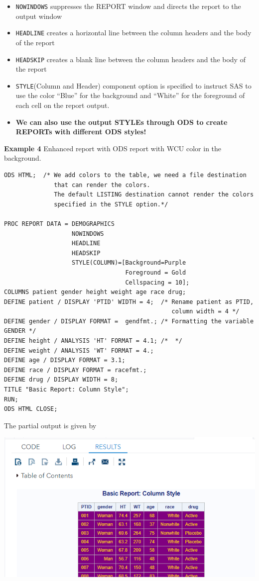 \documentclass[
]{book}
\begin{document}
\begin{itemize}
\item
  \texttt{NOWINDOWS} suppresses the REPORT window and directs the report to the output window
\item
  \texttt{HEADLINE} creates a horizontal line between the column headers and the body of the report
\item
  \texttt{HEADSKIP} creates a blank line between the column headers and the body of the report
\item
  \texttt{STYLE}(Column and Header) component option is specified to instruct SAS to use the color ``Blue'' for the background and ``White'' for the foreground of each cell on the report output.
\item
  \textbf{We can also use the output STYLEs through ODS to create REPORTs with different ODS styles!}
\end{itemize}

\textbf{Example 4} Enhanced report with ODS report with WCU color in the background.

\begin{verbatim}
ODS HTML;  /* We add colors to the table, we need a file destination 
              that can render the colors.
              The default LISTING destination cannot render the colors 
              specified in the STYLE option.*/

PROC REPORT DATA = DEMOGRAPHICS
                   NOWINDOWS
                   HEADLINE
                   HEADSKIP
                   STYLE(COLUMN)=[Background=Purple 
                                  Foreground = Gold 
                                  Cellspacing = 10];
COLUMNS patient gender height weight age race drug;
DEFINE patient / DISPLAY 'PTID' WIDTH = 4;  /* Rename patient as PTID, 
                                               column width = 4 */
DEFINE gender / DISPLAY FORMAT =  gendfmt.; /* Formatting the variable GENDER */
DEFINE height / ANALYSIS 'HT' FORMAT = 4.1; /*  */
DEFINE weight / ANALYSIS 'WT' FORMAT = 4.;
DEFINE age / DISPLAY FORMAT = 3.1;
DEFINE race / DISPLAY FORMAT = racefmt.;
DEFINE drug / DISPLAY WIDTH = 8;
TITLE "Basic Report: Column Style";
RUN;
ODS HTML CLOSE;
\end{verbatim}

The partial output is given by

\begin{center}\includegraphics[width=1\linewidth]{img13/w13-ods-report-stylish} \end{center}
\end{document}
